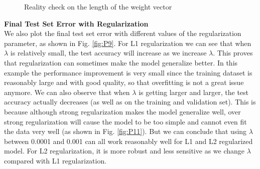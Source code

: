 \documentclass{article} %
\begin{document}
\begin{figure}%
	\centering
	\qquad
	\caption{Reality check on the length of the weight vector}%
	\label{fig:P4}%
\end{figure}

\textbf{Final Test Set Error with Regularization}\\
We also plot the final test set error with different values of the regularization parameter, as shown in Fig. \ref{fig:P9}. For L1 regularization we can see that when $\lambda$ is relatively small, the test accuracy will increase as we increase $\lambda$. This proves that regularization can sometimes make the model generalize better. In this example the performance improvement is very small since the training dataset is reasonably large and with good quality, so that overfitting is not a great issue anymore. We can also observe that when $\lambda$ is getting larger and larger, the test accuracy actually decreases (as well as on the training and validation set). This is because although strong regularization makes the model generalize well, over strong regularization will cause the model to be too simple and cannot even fit the data very well (as shown in Fig. \ref{fig:P11}). But we can conclude that using $\lambda$ between 0.0001 and 0.001 can all work reasonably well for L1 and L2 regularized model. For L2 regularization, it is more robust and less sensitive as we change $\lambda$ compared with L1 regularization.
\end{document}
